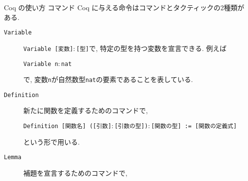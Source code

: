 \documentclass[dvipdfmx,cjk]{beamer}
\theoremstyle{mystyle}
\newcommand{\0}{\textbf{0}}
\begin{document}
\begin{frame}{Coq の使い方 コマンド}
  Coq に与える命令はコマンドとタクティックの2種類がある. 
\begin{description}
  \item[\tt Variable]
    {\tt Variable [変数]$\colon$[型]}で, 特定の型を持つ変数を宣言できる. 例えば
    
    {\tt Variable n$\colon$nat}
    
    で, 変数{\tt n}が自然数型{\tt nat}の要素であることを表している. 
%    
%    
  \item[\tt Definition]
    新たに関数を定義するためのコマンドで,
    
    {\tt Definition [関数名] ([引数]$\colon$[引数の型])$\colon$[関数の型] := 
    [関数の定義式]}
    
    という形で用いる. 
%    
%    
  \item[\tt Lemma]
    補題を宣言するためのコマンドで,
    

\end{description}
\end{frame}
\end{document}

